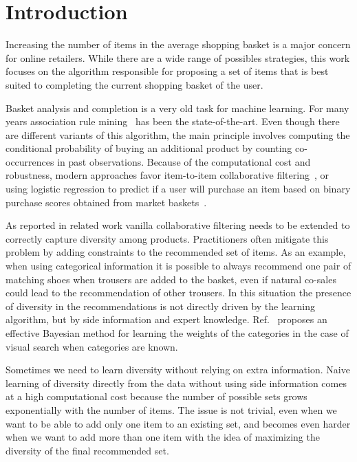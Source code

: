 \section{Introduction}
Increasing the number of items in the average shopping basket is a major concern for online
retailers. While there are a wide range of possibles strategies, this work
focuses on the algorithm responsible for proposing a set of items that is best suited to completing
the current shopping basket of the user.

Basket analysis and completion is a very old task for machine
learning. For many years association rule
mining~\cite{Agrawal:1993:MAR:170036.170072,Hipp:2000:AAR:360402.360421,Liu:1998:ICA:3000292.3000305} has
been the state-of-the-art. Even though there are different variants of this
algorithm, the main principle involves computing the conditional probability of
buying an additional product by counting co-occurrences in past observations.
Because of the computational cost and robustness, modern approaches favor item-to-item
collaborative filtering~\cite{1167344}, or using logistic regression to predict if a
user will purchase an item based on binary purchase scores obtained from market
baskets~\cite{LEE2005700}.

As reported in related work vanilla collaborative filtering needs to be extended to correctly capture diversity among products. 
Practitioners often mitigate this problem by adding constraints to the recommended
set of items. As an example, when using categorical information it is possible
to always recommend one pair of matching shoes when trousers are added to
the basket, even if natural co-sales could lead to the recommendation of other trousers.
In this situation the presence of diversity in the recommendations is not
directly driven by the learning algorithm, but by side information and
expert knowledge.  Ref.~\cite{Teo:2016:APD:2959100.2959171} proposes an effective
Bayesian method for learning the weights of the categories in the case of visual search
when categories are known.

Sometimes we need to learn diversity without relying on extra information. Naive
learning of diversity directly from the data without using side information
comes at a high computational cost because the number of possible sets grows exponentially with the 
number of items. 
The issue is not trivial, even when we want
to be able to add only one item to an existing set, and becomes even harder when we
want to add more than one item with the idea of maximizing the diversity of the
final recommended set.

